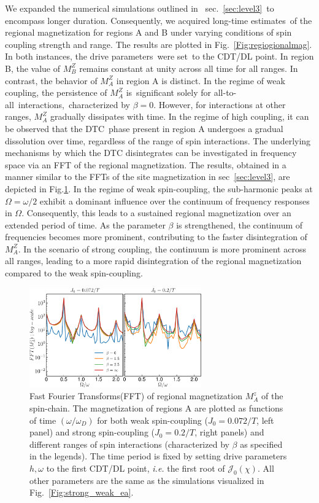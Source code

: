 \documentclass[
nofootinbib,
reprint,
superscriptaddress,
amsmath,amssymb,showkeys,
aps,
prb,
]{revtex4-2}
\begin{document}
	We expanded the numerical simulations outlined in  sec.~\ref{sec:level3} to encompass longer duration. Consequently, we acquired long-time estimates of the regional magnetization for regions A and B under varying conditions of spin coupling strength and range. The results are plotted in Fig.~\ref{Fig:regiogionalmag}. In both instances, the drive parameters were set to the CDT/DL point. In region B, the value of $M^Z_B$ remains constant at unity across all time for all ranges. In contrast, the behavior of $M^Z_A$ in region A is distinct. In the regime of weak coupling, the persistence of $M^Z_A$ is significant solely for all-to-all interactions, characterized by $\beta=0$. However, for interactions at other ranges, $M^Z_A$ gradually dissipates with time. In the regime of high coupling, it can be observed that the DTC phase present in region A undergoes a gradual dissolution over time, regardless of the range of spin interactions. The underlying mechanisms by which the DTC disintegrates can be investigated in frequency space via an FFT of the regional magnetization. The results, obtained in a manner similar to the FFTs of the site magnetization in sec~\ref{sec:level3}, are depicted in Fig.\ref{Fig:regionalFFT}. In the regime of weak spin-coupling, the sub-harmonic peaks at $\Omega=\omega/2$ exhibit a dominant influence over the continuum of frequency responses in $\Omega$. Consequently, this leads to a sustained regional magnetization over an extended period of time. As the parameter $\beta$ is strengthened,  the continuum of frequencies becomes more prominent, contributing to the faster disintegration of $M^Z_A$. In the scenario of strong coupling, the continuum is more prominent across all ranges, leading to a more rapid disintegration of the regional magnetization compared to the weak spin-coupling.
	\begin{figure}[t!]
		\centering
		\includegraphics[width = 7.4cm]{mz_betas.pdf}
		\caption{
			Fast Fourier Transforms(FFT) of regional magnetization $M^z_{A}$ of the spin-chain. The magnetization of regions A are plotted  as functions of time $(\omega/\omega_D)$ for both weak spin-coupling ($J_0=0.072/T$, left panel) and strong spin-coupling ($J_0=0.2/T$, right panels) and different ranges of spin interactions (characterized by $\beta$ as specified in the legends). The time period is fixed by setting drive parameters $h,\omega$ to the first CDT/DL point, \textit{i.e.} the first root of $\mathcal{J}_0(\chi)$. All other parameters are the same as the simulations visualized in Fig.~\ref{Fig:strong_weak_ea}.}
		\label{Fig:regionalFFT}
	\end{figure}
	
\end{document}
